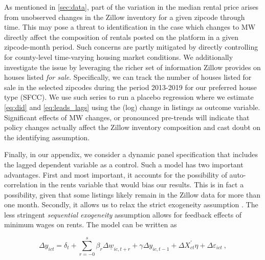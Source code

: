 As mentioned in \autoref{sec:data}, part of the variation in the median rental price arises 
from unobserved changes in the Zillow inventory for a given zipcode through time. This may 
pose a threat to identification in the case which changes to MW directly affect the composition 
of rentals posted on the platform in a given zipcode-month period. Such concerns are partly 
mitigated by directly controlling for county-level time-varying housing market conditions. We 
additionally investigate the issue by leveraging the richer set of information Zillow provides 
on houses listed \textit{for sale}. Specifically, we can track the number of houses listed for 
sale in the selected zipcodes during the period 2013-2019 for our preferred house type (SFCC). 
We use such series to run a placebo regression where we estimate \autoref{eq:did} and 
\autoref{eq:leads_lags} using the (log) change in listings as outcome variable. Significant 
effects of MW changes, or pronounced pre-trends will indicate that policy changes actually 
affect the Zillow inventory composition and cast doubt on the identifying assumption.

Finally, in our appendix, we consider a dynamic panel specification that includes the lagged
dependent variable as a control. Such a model has two important advantages. First and most 
important, it accounts for the possibility of auto-correlation in the rents variable that 
would bias our results. This is in fact a possibility, given that some listings likely remain 
in the Zillow data for more than one month. Secondly, it allows us to relax the strict 
exogeneity assumption \textcite{ArellanoHonore2001}. The less stringent \textit{sequential 
exogeneity} assumption allows for feedback effects of minimum wages on rents. The model 
can be written as

\begin{equation}\label{eq:ab_panel}
	\Delta y_{ict} = \delta_t
				   + \sum_{r=-0}^{s} \beta_r \Delta \underline{w}_{ic,t+r}
				   + \gamma \Delta y_{ic,t-1} + \Delta X^{'}_{ct}\eta
				   + \Delta \varepsilon_{ict} \ ,
\end{equation}

